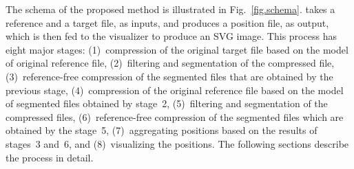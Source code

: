 
The schema of the proposed method is illustrated in Fig.~\ref{fig.schema}. \smashpp takes a reference and a target file, as inputs, and produces a position file, as output, which is then fed to the \smashpp visualizer to produce an SVG image. This process has eight major stages: (1)~compression of the original target file based on the model of original reference file, (2)~filtering and segmentation of the compressed file, (3)~reference-free compression of the segmented files that are obtained by the previous stage, (4)~compression of the original reference file based on the model of segmented files obtained by stage~2, (5)~filtering and segmentation of the compressed files, (6)~reference-free compression of the segmented files which are obtained by the stage~5, (7)~aggregating positions based on the results of stages~3 and~6, and (8)~visualizing the positions. The following sections describe the process in detail.

